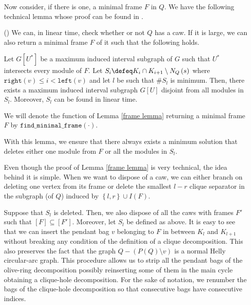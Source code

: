 \documentclass{article}
\begin{document}
    Now consider, if there is one,
    a minimal frame $F$ in $Q$.
    We have the following technical lemma
    whose proof can be found in \cite{main}.

    \begin{lemma} (\cite{main}) \label{frame lemma}
        We can, in linear time,
        check whether or not
        $Q$ has a caw.
        If it is large,
        we can also return
        a minimal frame $F$ of it
        such that the following
        holds.

        Let $G\left[U^{*}\right]$ be
        a maximum induced interval
        subgraph of $G$
        such that $U^{*}$ 
        intersects every module
        of $F$.
        Let $S_{i} \defeq K_{i} \cap K_{i+1} \setminus N_{Q}\left(s\right)$ 
        where $\texttt{right}\left(v\right) \leq i < \texttt{left}\left(v\right)$
        and let $l$ be such
        that $\#S_{l}$ is minimum.
        Then, there exists a maximum
        induced interval subgraph
        $G\left[U\right]$ 
        disjoint from all modules in $S_{l}$.
        Moreover, $S_{l}$ can be
        found in linear time.
    \end{lemma}
    
    We will denote the
    function of Lemma \ref{frame lemma}
    returning a minimal frame
    $F$ by $\texttt{find\_minimal\_frame}\left(\cdot\right)$.

    With this lemma, we ensure that
    there always exists a minimum
    solution that deletes either 
    one module from $F$ or all
    the modules in $S_{l}$.
    
    Even though the proof
    of Lemma \ref{frame lemma}
    is very technical, the
    idea behind it is simple.
    When we want to dispose
    of a caw, we can either
    branch on deleting one 
    vertex from its frame
    or delete the smallest
    $l-r$ clique separator
    in the subgraph (of $Q$) induced by
    $\left\{l, r\right\} \cup I\left(F\right)$.

    Suppose that $S_{l}$ is
    deleted.
    Then, we
    also dispose of all
    the caws with frames $F'$ 
    such that $\left[F\right] \subseteq \left[F'\right]$.
    Moreover, let $S_{l}$ 
    be defined as above. It
    is easy to see that we can
    insert the pendant bag $v$
    belonging to $F$
    in between $K_{l}$ and
    $K_{l+1}$ without breaking
    any condition of the definition 
    of a clique decomposition.
    This also preserves the fact
    that the graph $Q - \left(P\left(Q\right) \setminus v\right)$
    is a normal Helly circular-arc graph.
    This procedure
    allows us to strip
    all the pendant bags
    of the olive-ring
    decomposition possibly 
    reinserting some of 
    them in the main cycle
    obtaining a clique-hole decomposition.
    For the sake of notation,
    we renumber the
    bags of the clique-hole decomposition
    so that consecutive
    bags have consecutive
    indices.
\end{document}
